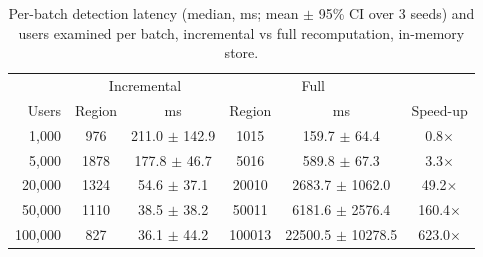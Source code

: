 \begin{table}[t]
\centering
\caption{Per-batch detection latency (median, ms; mean $\pm$ 95\% CI over 3 seeds)
and users examined per batch, incremental vs full recomputation, in-memory store.}
\label{tab:scale}
\begin{tabular}{rccccc}
\toprule
& \multicolumn{2}{c}{Incremental} & \multicolumn{2}{c}{Full} & \\
Users & Region & ms & Region & ms & Speed-up \\
\midrule
1,000 & 976 & 211.0 $\pm$ 142.9 & 1015 & 159.7 $\pm$ 64.4 & 0.8$\times$ \\
5,000 & 1878 & 177.8 $\pm$ 46.7 & 5016 & 589.8 $\pm$ 67.3 & 3.3$\times$ \\
20,000 & 1324 & 54.6 $\pm$ 37.1 & 20010 & 2683.7 $\pm$ 1062.0 & 49.2$\times$ \\
50,000 & 1110 & 38.5 $\pm$ 38.2 & 50011 & 6181.6 $\pm$ 2576.4 & 160.4$\times$ \\
100,000 & 827 & 36.1 $\pm$ 44.2 & 100013 & 22500.5 $\pm$ 10278.5 & 623.0$\times$ \\
\bottomrule
\end{tabular}
\end{table}
